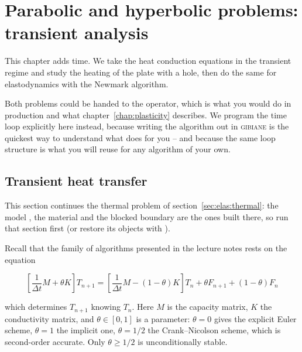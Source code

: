 \chapter{Parabolic and hyperbolic problems: transient analysis}
\label{chap:heat}


This chapter adds time. We take the heat conduction equations in the
transient regime and study the heating of the plate with a hole, then do the
same for elastodynamics with the Newmark algorithm.

Both problems could be handed to the  operator, which is what you
would do in production and what chapter~\ref{chap:plasticity} describes. We
program the time loop explicitly here instead, because writing the algorithm
out in \textsc{gibiane} is the quickest way to understand what 
does for you -- and because the same loop structure is what you will reuse
for any algorithm of your own.

\section{Transient heat transfer}

\noindent This section continues the thermal problem of
section~\ref{sec:elas:thermal}: the model , the material 
and the blocked boundary  are the ones built there, so run that
section first (or restore its objects with ).


Recall that the family of algorithms presented in the lecture notes rests on
the equation

\begin{equation}
\left[\frac{1}{\Delta t}M + \theta K\right] T_{n+1}
=
\left[\frac{1}{\Delta t}M - (1-\theta) K\right] T_{n}
+ \theta F_{n+1} + (1-\theta) F_{n}
\label{eq:heat:theta}
\end{equation}

%
%
%
\noindent which determines $T_{n+1}$ knowing $T_{n}$. Here $M$ is the
capacity matrix, $K$ the conductivity matrix, and $\theta\in[0,1]$ is a
parameter: $\theta=0$ gives the explicit Euler scheme, $\theta=1$ the implicit
one, $\theta=1/2$ the Crank--Nicolson scheme, which is second-order accurate.
Only $\theta\geq1/2$ is unconditionally stable.

